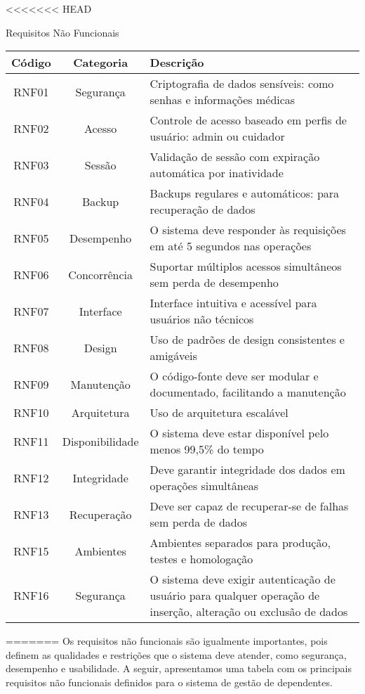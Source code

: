 <<<<<<< HEAD
\begin{quadro}
    \caption{\label{quadro_requisitos_nf}Requisitos Não Funcionais}
    \begin{tabular}{|c|c|p{10cm}|}
        \hline
        \textbf{Código} & \textbf{Categoria} & \textbf{Descrição} \\ \hline
        RNF01  & Segurança       & Criptografia de dados sensíveis: como senhas e informações médicas \\ \hline
        RNF02  & Acesso          & Controle de acesso baseado em perfis de usuário: admin ou cuidador \\ \hline
        RNF03  & Sessão          & Validação de sessão com expiração automática por inatividade \\ \hline
        RNF04  & Backup          & Backups regulares e automáticos: para recuperação de dados \\ \hline
        RNF05  & Desempenho      & O sistema deve responder às requisições em até 5 segundos nas operações \\ \hline
        RNF06  & Concorrência    & Suportar múltiplos acessos simultâneos sem perda de desempenho \\ \hline
        RNF07  & Interface       & Interface intuitiva e acessível para usuários não técnicos \\ \hline
        RNF08  & Design          & Uso de padrões de design consistentes e amigáveis \\ \hline
        RNF09  & Manutenção      & O código-fonte deve ser modular e documentado, facilitando a manutenção \\ \hline
        RNF10  & Arquitetura     & Uso de arquitetura escalável \\ \hline
        RNF11  & Disponibilidade & O sistema deve estar disponível pelo menos 99,5\% do tempo \\ \hline
        RNF12  & Integridade     & Deve garantir integridade dos dados em operações simultâneas \\ \hline
        RNF13  & Recuperação     & Deve ser capaz de recuperar-se de falhas sem perda de dados \\ \hline
        RNF15  & Ambientes       & Ambientes separados para produção, testes e homologação \\ \hline
        RNF16  & Segurança       & O sistema deve exigir autenticação de usuário para qualquer operação de inserção, alteração ou exclusão de dados \\ \hline
    \end{tabular}
\end{quadro}
=======
Os requisitos não funcionais são igualmente importantes, pois definem as qualidades e restrições que o sistema deve atender, como segurança, desempenho e usabilidade. A seguir, apresentamos uma tabela com os principais requisitos não funcionais definidos para o sistema de gestão de dependentes.

